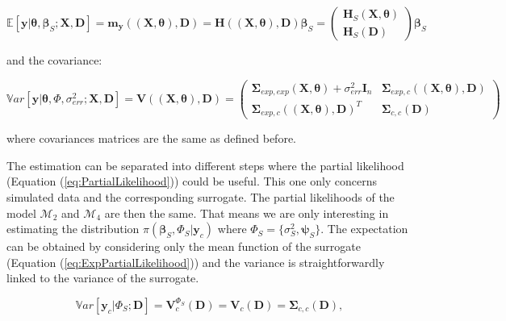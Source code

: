 \documentclass[soumission]{jsfds}
\newcommand{\EqRef}[1] {Equation (\ref{#1})}
\edef\hc{\string: }
\begin{document}
\begin{equation}
\mathbb{E}[\boldsymbol{y}|\boldsymbol{\theta},\boldsymbol{\beta}_S;\boldsymbol{X},\boldsymbol{D}]=\boldsymbol{m}_{\boldsymbol{y}}((\boldsymbol{X},\boldsymbol{\theta}),\boldsymbol{D})=\boldsymbol{H}((\boldsymbol{X},\boldsymbol{\theta}),\boldsymbol{D})\boldsymbol{\beta}_S=\begin{pmatrix}
\boldsymbol{H}_S(\boldsymbol{X},\boldsymbol{\theta})\\
\boldsymbol{H}_S(\boldsymbol{D})
\end{pmatrix}\boldsymbol{\beta}_S
\label{eq:MeanFullLikelihood2}
\end{equation}

and the covariance\hc

\begin{equation}
\mathbb{V}ar[\boldsymbol{y}|\boldsymbol{\theta},\Phi,\sigma_{err}^2;\boldsymbol{X},\boldsymbol{D}]=\boldsymbol{V}((\boldsymbol{X},\boldsymbol{\theta}),\boldsymbol{D})=\begin{pmatrix}
\boldsymbol{\Sigma}_{exp,exp}(\boldsymbol{X},\boldsymbol{\theta}) +\sigma_{err}^2\boldsymbol{I}_n & \boldsymbol{\Sigma}_{exp,c}((\boldsymbol{X},\boldsymbol{\theta}),\boldsymbol{D})\\
\boldsymbol{\Sigma}_{exp,c}((\boldsymbol{X},\boldsymbol{\theta}),\boldsymbol{D})^T & \boldsymbol{\Sigma}_{c,c}(\boldsymbol{D})
\end{pmatrix}
\label{eq:VarianceFullLikelihood}
\end{equation}

where covariances matrices are the same as defined before.\newline


The estimation can be separated into different steps where the partial likelihood (Equation (\ref{eq:PartialLikelihood})) could be useful.
This one only concerns simulated data and the corresponding surrogate.
The partial likelihoods of the model $\mathcal{M}_2$ and $\mathcal{M}_4$ are then the same.
That means we are only interesting in estimating the distribution $\pi(\boldsymbol{\beta}_S,\Phi_S|\boldsymbol{y}_c)$ where $\Phi_S=\{\sigma_S^2,\boldsymbol{\psi}_S\}$. The expectation can be obtained by considering only the mean function of the surrogate
(\EqRef{eq:ExpPartialLikelihood}) and the variance is straightforwardly linked to the variance of the surrogate.

\begin{equation*}
\mathbb{V}ar[\boldsymbol{y}_c|\Phi_S;\boldsymbol{D}] = \boldsymbol{V}_c^{\Phi_S}(\boldsymbol{D})=\boldsymbol{V}_c(\boldsymbol{D})= \boldsymbol{\Sigma}_{c,c}(\boldsymbol{D}),
\end{equation*}
\end{document}
